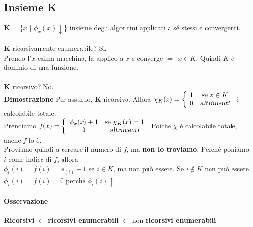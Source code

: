 \documentclass[10pt]{book}
\begin{document}
\subsection{Insieme K}
\textbf{K} = \{$x$ $|$ $\phi_x(x)\downarrow$\} insieme degli algoritmi applicati a sé stessi e convergenti.
\paragraph{}\textbf{K} ricorsivamente enumerabile? Si.\\
Prendo l'$x$-esima macchina, la applico a $x$ e converge $\Rightarrow$ $x \in K$. Quindi $K$ è dominio di una funzione.
\paragraph{}\textbf{K} ricorsivo? No.\\
\textbf{Dimostrazione} Per assurdo, \textbf{K} ricorsivo. Allora \begin{math} \chi_K(x) = 
\left\{
	\begin{array}{c c}
		1 & \textsl{se }x \in K\\
		0 & \textsl{altrimenti}
	\end{array}
\right.
\end{math}
è calcolabile totale.\\
Prendiamo \begin{math}
f(x) = 
	\left\{
	\begin{array}{c c}
		\phi_x(x) + 1 & \textsl{se }\chi_K(x) = 1\\
		0 & \textsl{altrimenti}
	\end{array}
	\right.
\end{math}
Poiché $\chi$ è calcolabile totale, anche $f$ lo è.\\
Proviamo quindi a cercare il numero di $f$, ma \textbf{non lo troviamo}. Perché poniamo $i$ come indice di $f$, allora\\$\phi_i(i) = f(i) = \phi_(i) + 1$ se $i \in K$, ma non può essere. Se $i \not\in K$ non può essere $\phi_i(i) = f(i) = 0$ perché $\phi_i(i)\uparrow$
\paragraph{Osservazione} \textbf{Ricorsivi} $\subset$ \textbf{ricorsivi enumerabili} $\subset$ non \textbf{ricorsivi enumerabili}
\end{document}
